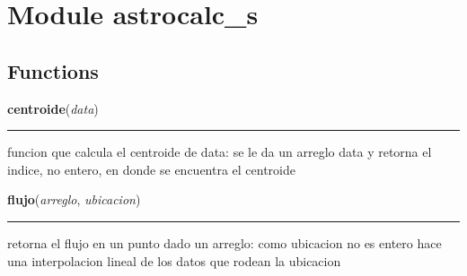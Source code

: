 %
%
%


\section{Module astrocalc\_s}

    \label{astrocalc_s}


  \subsection{Functions}

    \label{astrocalc_s:centroide}

    \vspace{0.5ex}

\hspace{.8\funcindent}\begin{boxedminipage}{\funcwidth}

    \raggedright \textbf{centroide}(\textit{data})

    \vspace{-1.5ex}

    \rule{\textwidth}{0.5\fboxrule}
\setlength{\parskip}{2ex}
    funcion que calcula el centroide de data: se le da un arreglo data y 
    retorna el indice, no entero, en donde se encuentra el centroide

\setlength{\parskip}{1ex}
    \end{boxedminipage}

    \label{astrocalc_s:flujo}

    \vspace{0.5ex}

\hspace{.8\funcindent}\begin{boxedminipage}{\funcwidth}

    \raggedright \textbf{flujo}(\textit{arreglo}, \textit{ubicacion})

    \vspace{-1.5ex}

    \rule{\textwidth}{0.5\fboxrule}
\setlength{\parskip}{2ex}
    retorna el flujo en un punto dado un arreglo: como ubicacion no es 
    entero hace una interpolacion lineal de los datos que rodean la 
    ubicacion

\setlength{\parskip}{1ex}
    \end{boxedminipage}


